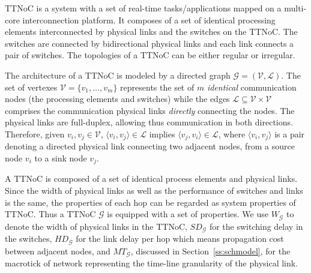 \documentclass[journal]{IEEEtran}
\newcommand{\calG}{\mathcal{G}}
\newcommand{\calV}{\mathcal{V}}
\newcommand{\calL}{\mathcal{L}}
\newcommand{\width}{\mathit{W}_\calG}
\newcommand{\SD}{\mathit{SD}_\calG}
\newcommand{\HD}{\mathit{HD}_\calG}
\newcommand{\MT}{\mathit{MT}_\calG}
\begin{document}
TTNoC is a system with a set of real-time tasks/applications mapped on
a multi-core interconnection platform.  It composes of a set of
identical processing elements interconnected by physical links and the
switches on the TTNoC.  The switches are connected by bidirectional
physical links and each link connects a pair of switches.  The
topologies of a TTNoC can be either regular or irregular.

The architecture of a TTNoC is
modeled by a directed graph $\calG=(\calV,\calL)$. The set of vertexes
$\mathcal{V}=\{ v_{1},\dots,v_{m}\}$ represents the set of $m$
\emph{identical} communication nodes (the processing elements and
switches) while the edges $\mathcal{L}\subseteq \mathcal{V} \times
\mathcal{V}$ comprises the communication physical links
\emph{directly} connecting the nodes.  The physical links are
full-duplex, allowing thus communication in both
directions. Therefore, given $v_i,v_j\in\calV$, $\langle
v_i,v_j\rangle \in\calL$ implies $\langle v_j,v_i\rangle\in\calL$,
where $\langle v_i,v_j\rangle$ is a pair denoting a directed physical
link connecting two adjacent nodes, from a source node $v_i$ to a sink node $v_j$.

 
A TTNoC is composed of a set of identical process elements and
physical links.  Since the width of physical links as well as the
performance of switches and links is the same, the properties of each
hop can be regarded as system properties of TTNoC.  Thus a TTNoC
$\calG$ is equipped with a set of properties.  We use $\width$ to
denote the width of physical links in the TTNoC, $\SD$ for the
switching delay in the switches, $\HD$ for the link delay per hop
which means propagation cost between adjacent nodes, and $\MT$,
discussed in Section~\ref{ss:schmodel}, for the macrotick of network
representing the time-line granularity of the physical link.

\end{document}
